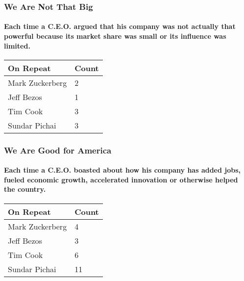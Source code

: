 \hypertarget{we-are-not-that-big}{%
\subsubsection{We Are Not That Big}\label{we-are-not-that-big}}

\hypertarget{each-time-a-ceo-argued-that-his-company-was-not-actually-that-powerful-because-its-market-share-was-small-or-its-influence-was-limited}{%
\paragraph{Each time a C.E.O. argued that his company was not actually
that powerful because its market share was small or its influence was
limited.}\label{each-time-a-ceo-argued-that-his-company-was-not-actually-that-powerful-because-its-market-share-was-small-or-its-influence-was-limited}}

\begin{longtable}[]{@{}ll@{}}
\toprule
\textbf{On Repeat} & \textbf{Count}\tabularnewline
\midrule
\endhead
Mark Zuckerberg & 2\tabularnewline
Jeff Bezos & 1\tabularnewline
Tim Cook & 3\tabularnewline
Sundar Pichai & 3\tabularnewline
\bottomrule
\end{longtable}

\hypertarget{we-are-good-for-america}{%
\subsubsection{We Are Good for America}\label{we-are-good-for-america}}

\hypertarget{each-time-a-ceo-boasted-about-how-his-company-has-added-jobs-fueled-economic-growth-accelerated-innovation-or-otherwise-helped-the-country}{%
\paragraph{Each time a C.E.O. boasted about how his company has added
jobs, fueled economic growth, accelerated innovation or otherwise helped
the
country.}\label{each-time-a-ceo-boasted-about-how-his-company-has-added-jobs-fueled-economic-growth-accelerated-innovation-or-otherwise-helped-the-country}}

\begin{longtable}[]{@{}ll@{}}
\toprule
\textbf{On Repeat} & \textbf{Count}\tabularnewline
\midrule
\endhead
Mark Zuckerberg & 4\tabularnewline
Jeff Bezos & 3\tabularnewline
Tim Cook & 6\tabularnewline
Sundar Pichai & 11\tabularnewline
\bottomrule
\end{longtable}

